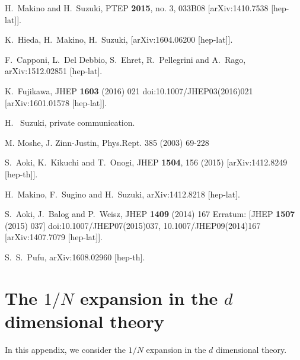 \documentclass[preprint]{ptephy_v1}%
\begin{document}
\begin{thebibliography}{99}
  H.~Makino and H.~Suzuki,
  PTEP {\bf 2015}, no. 3, 033B08
  [arXiv:1410.7538 [hep-lat]].

  K.~Hieda, H.~Makino, H.~Suzuki,
  [arXiv:1604.06200 [hep-lat]].

  F.~Capponi, L.~Del Debbio, S.~Ehret, R.~Pellegrini and A.~Rago,
  arXiv:1512.02851 [hep-lat].
        
  K.~Fujikawa,
  JHEP {\bf 1603} (2016) 021
  doi:10.1007/JHEP03(2016)021
  [arXiv:1601.01578 [hep-lat]].

H. ~Suzuki, private communication.

M. Moshe, J. Zinn-Justin,
Phys.Rept. 385 (2003) 69-228
  
  S.~Aoki, K.~Kikuchi and T.~Onogi,
  JHEP {\bf 1504}, 156 (2015)
  [arXiv:1412.8249 [hep-th]].

  H.~Makino, F.~Sugino and H.~Suzuki,
  arXiv:1412.8218 [hep-lat].
\fi  

  S.~Aoki, J.~Balog and P.~Weisz,
  JHEP {\bf 1409} (2014) 167
   Erratum: [JHEP {\bf 1507} (2015) 037]
  doi:10.1007/JHEP07(2015)037, 10.1007/JHEP09(2014)167
  [arXiv:1407.7079 [hep-lat]].
  
  S.~S.~Pufu,
  arXiv:1608.02960 [hep-th].
    
\end{thebibliography}



\appendix

\section{The $1/N$ expansion in the $d$ dimensional theory}   
\label{app:d-dim}
In this appendix, we consider the $1/N$ expansion in the $d$ dimensional theory.
\end{document}
